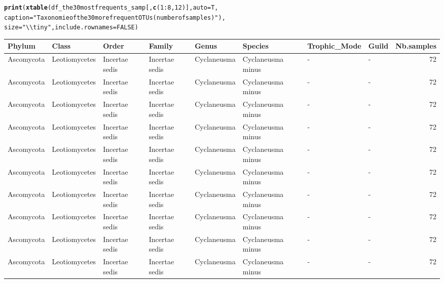 \documentclass[12pt]{article}\usepackage[]{graphicx}\usepackage[]{color}
\makeatletter
\newcommand{\hlnum}[1]{\textcolor[rgb]{0.686,0.059,0.569}{#1}}%
\newcommand{\hlstr}[1]{\textcolor[rgb]{0.192,0.494,0.8}{#1}}%
\newcommand{\hlopt}[1]{\textcolor[rgb]{0,0,0}{#1}}%
\newcommand{\hlstd}[1]{\textcolor[rgb]{0.345,0.345,0.345}{#1}}%
\newcommand{\hlkwc}[1]{\textcolor[rgb]{0.333,0.667,0.333}{#1}}%
\newcommand{\hlkwd}[1]{\textcolor[rgb]{0.737,0.353,0.396}{\textbf{#1}}}%
\newenvironment{kframe}{%
 \def\at@end@of@kframe{}%
 \ifinner\ifhmode%
  \def\at@end@of@kframe{\end{minipage}}%
  \begin{minipage}{\columnwidth}%
 \fi\fi%
 \def\FrameCommand##1{\hskip\@totalleftmargin \hskip-\fboxsep
 \colorbox{shadecolor}{##1}\hskip-\fboxsep
     \hskip-\linewidth \hskip-\@totalleftmargin \hskip\columnwidth}%
 \MakeFramed {\advance\hsize-\width
   \@totalleftmargin\z@ \linewidth\hsize
   \@setminipage}}%
 {\par\unskip\endMakeFramed%
 \at@end@of@kframe}
\numberwithin{figure}{section}
\makeatother
\begin{document}
\begin{landscape}
\begin{kframe}
\begin{alltt}
\hlkwd{print}\hlstd{(}\hlkwd{xtable}\hlstd{(df_the30mostfrequents_samp[,} \hlkwd{c}\hlstd{(}\hlnum{1}\hlopt{:}\hlnum{8}\hlstd{,} \hlnum{12}\hlstd{)],} \hlkwc{auto} \hlstd{= T,}
      \hlkwc{caption} \hlstd{=} \hlstr{"Taxonomie of the 30 more frequent OTUs (number of samples)"}\hlstd{),}
      \hlkwc{size} \hlstd{=} \hlstr{"\textbackslash{}\textbackslash{}tiny"}\hlstd{,} \hlkwc{include.rownames} \hlstd{=} \hlnum{FALSE}\hlstd{)}
\end{alltt}
\end{kframe}%
\begin{table}[ht]
\centering
\begingroup\tiny
\begin{tabular}{llllllllr}
  \hline
Phylum & Class & Order & Family & Genus & Species & Trophic\_Mode & Guild & Nb.samples \\ 
  \hline
Ascomycota & Leotiomycetes & Incertae sedis & Incertae sedis & Cyclaneusma & Cyclaneusma minus & - & - & 72 \\ 
  Ascomycota & Leotiomycetes & Incertae sedis & Incertae sedis & Cyclaneusma & Cyclaneusma minus & - & - & 72 \\ 
  Ascomycota & Leotiomycetes & Incertae sedis & Incertae sedis & Cyclaneusma & Cyclaneusma minus & - & - & 72 \\ 
  Ascomycota & Leotiomycetes & Incertae sedis & Incertae sedis & Cyclaneusma & Cyclaneusma minus & - & - & 72 \\ 
  Ascomycota & Leotiomycetes & Incertae sedis & Incertae sedis & Cyclaneusma & Cyclaneusma minus & - & - & 72 \\ 
  Ascomycota & Leotiomycetes & Incertae sedis & Incertae sedis & Cyclaneusma & Cyclaneusma minus & - & - & 72 \\ 
  Ascomycota & Leotiomycetes & Incertae sedis & Incertae sedis & Cyclaneusma & Cyclaneusma minus & - & - & 72 \\ 
  Ascomycota & Leotiomycetes & Incertae sedis & Incertae sedis & Cyclaneusma & Cyclaneusma minus & - & - & 72 \\ 
  Ascomycota & Leotiomycetes & Incertae sedis & Incertae sedis & Cyclaneusma & Cyclaneusma minus & - & - & 72 \\ 
  Ascomycota & Leotiomycetes & Incertae sedis & Incertae sedis & Cyclaneusma & Cyclaneusma minus & - & - & 72 \\ 

\end{tabular}
\end{table}
\end{landscape}
\end{document}
